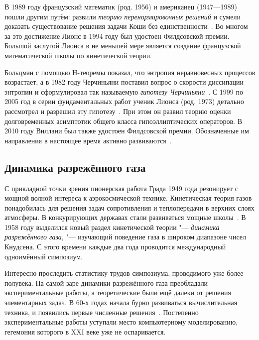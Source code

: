 \documentclass[a4paper, 12pt, oneside]{article} %
\begin{document}
В 1989 году французский математик  (род. 1956) и
американец  (1947---1989) пошли другим путём:
развили \emph{теорию перенормировочных решений} и сумели доказать
существование решения задачи Коши без
единственности~\cite{diperna1989cauchy}. Во многом за это достижение
Лионс в 1994 году был удостоен Филдсовской премии. Большой заслугой
Лионса в не меньшей мере является создание французской математической
школы по кинетической теории.

Больцман с помощью H-теоремы показал, что энтропия неравновесных
процессов возрастает, а в 1982 году Черчиньяни поставил вопрос о
скорости диссипации энтропии и сформулировал так называемую
\emph{гипотезу Черчиньяни}~\cite{cercignani1982conjecture}. С 1999 по
2005 год в серии фундаментальных работ ученик Лионса  (род. 1973) детально рассмотрел и разрешил эту
гипотезу~\cite{yau2010work}. При этом он развил теорию оценки
долговременных асимптотик общего класса гипоэллиптических операторов. В
2010 году Виллани был также удостоен Филдсовской премии. Обозначенные им
направления в настоящее время активно развиваются~\cite{villani2002review}.

\subsection{Динамика разрежённого газа}

С прикладной точки зрения пионерская работа Града 1949 года резонирует с
мощной волной интереса к аэрокосмической технике. Кинетическая теория
газов понадобилась для решения задач сопротивления и теплопередачи в
верхних слоях атмосферы. В конкурирующих державах стали развиваться
мощные школы~\cite{grad1958principles, kogan1967dynamics}. В 1958 году
выделился новый раздел кинетической теории "--- \emph{динамика
разрежённого газа}, "--- изучающий поведение газа в широком диапазоне чисел Кнудсена.
С этого времени каждые два года проводится международный
одноимённый симпозиум.

Интересно проследить статистику трудов симпозиума, проводимого уже более
полувека. На самой заре динамики разрежённого газа преобладали
экспериментальные работы, а теоретические были ещё далеки от решения
элементарных задач. В 60-х годах начала бурно развиваться вычислительная
техника, и появились первые численные
решения~\cite{cercignani1978applications}. Постепенно экспериментальные
работы уступали место компьютерному моделированию, гегемония которого в
XXI веке уже не оспаривается.
\end{document}
